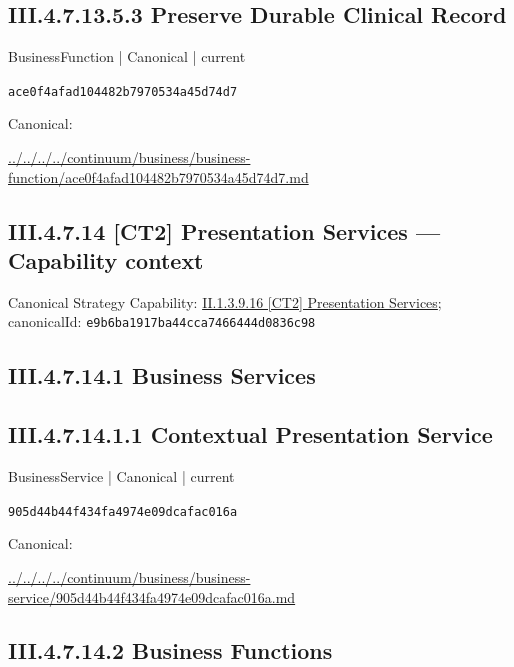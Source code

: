 \documentclass[10pt,a4paper]{article}
\begin{document}
\subsection*{III.4.7.13.5.3 Preserve Durable Clinical Record}
\label{element-ace0f4afad104482b7970534a45d74d7}
{\small BusinessFunction | Canonical | current}\par
\texttt{ace0f4afad104482b7970534a45d74d7}\par
Canonical: \par
{\footnotesize\url{../../../../continuum/business/business-function/ace0f4afad104482b7970534a45d74d7.md}}\par
\subsection*{III.4.7.14 [CT2] Presentation Services — Capability context}
Canonical Strategy Capability: \hyperref[element-e9b6ba1917ba44cca7466444d0836c98]{II.1.3.9.16 [CT2] Presentation Services}; canonicalId: \texttt{e9b6ba1917ba44cca7466444d0836c98}\par
\subsection*{III.4.7.14.1 Business Services}
\subsection*{III.4.7.14.1.1 Contextual Presentation Service}
\label{element-905d44b44f434fa4974e09dcafac016a}
{\small BusinessService | Canonical | current}\par
\texttt{905d44b44f434fa4974e09dcafac016a}\par
Canonical: \par
{\footnotesize\url{../../../../continuum/business/business-service/905d44b44f434fa4974e09dcafac016a.md}}\par
\subsection*{III.4.7.14.2 Business Functions}
\end{document}
